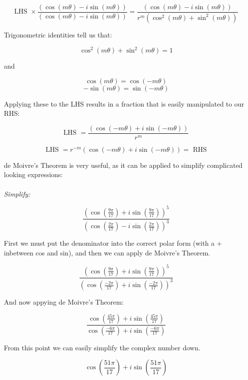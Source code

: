 \documentclass{article}
\begin{document}
\[\text{LHS  }\times\frac{\left(\cos\left(m\theta\right)-i\sin\left(m\theta\right)\right)}{\left(\cos\left(m\theta\right)-i\sin\left(m\theta\right)\right)}=\frac{\left(\cos\left(m\theta\right)-i\sin\left(m\theta\right)\right)}{r^m\left(\cos^2\left(m\theta\right)+\sin^2\left(m\theta\right)\right)}\]

\noindent Trigonometric identities tell us that:

\[\cos^2\left(m\theta\right)+\sin^2\left(m\theta\right)=1\]

\noindent and

\[\cos\left(m\theta\right)=\cos\left(-m\theta\right)\]
\[-\sin\left(m\theta\right)=\sin\left(-m\theta\right)\]

\noindent Applying these to the LHS results in a fraction that is easily manipulated to our RHS:

\[\text{LHS  }=\frac{\left(\cos\left(-m\theta\right)+i\sin\left(-m\theta\right)\right)}{r^m}\]

\[\text{LHS  }=r^{-m}\left(\cos\left(-m\theta\right)+i\sin\left(-m\theta\right)\right)=\text{  RHS}\]

\noindent de Moivre's Theorem is very useful, as it can be applied to simplify
complicated looking expressions: \\\\

\noindent \textit{Simplify:}

\[\frac{\left(\cos\left(\frac{9\pi}{17}\right)+i\sin\left(\frac{9\pi}{17}\right)\right)^5}{\left(\cos\left(\frac{2\pi}{17}\right)-i\sin\left(\frac{2\pi}{17}\right)\right)^3}\]

\noindent First we must put the denominator into the correct polar form (with a
\(+\) inbetween cos and sin), and then we can apply de Moivre's Theorem.

\[\frac{\left(\cos\left(\frac{9\pi}{17}\right)+i\sin\left(\frac{9\pi}{17}\right)\right)^5}{\left(\cos\left(\frac{-2\pi}{17}\right)+i\sin\left(\frac{-2\pi}{17}\right)\right)^3}\]

\noindent And now appying de Moivre's Theorem:

\[\frac{\cos\left(\frac{45\pi}{17}\right)+i\sin\left(\frac{45\pi}{17}\right)}{\cos\left(\frac{-6\pi}{17}\right)+i\sin\left(\frac{-6\pi}{17}\right)}\]

\noindent From this point we can easily simplify the complex number down.

\[\cos\left(\frac{51\pi}{17}\right)+i\sin\left(\frac{51\pi}{17}\right)\]
\end{document}
